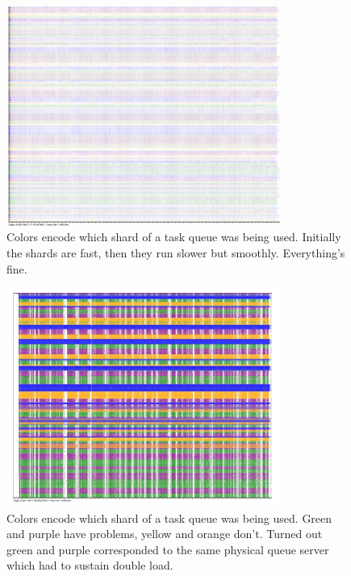 \documentclass{article}
\begin{document}
\begin{figure}[p]
\center
\includegraphics[width=0.8\textwidth]{pics/splot/4-rabbits.png}
\caption{Colors encode which shard of a task queue was being used. Initially the shards are fast, then they run slower but smoothly. Everything's fine.}
\end{figure}

\begin{figure}[p]
\center
\includegraphics[width=0.8\textwidth]{pics/splot/rabbit-collision.png}
\caption{Colors encode which shard of a task queue was being used. Green and purple have problems, yellow and orange don't. Turned out green and purple corresponded to the same physical queue server which had to sustain double load.}
\end{figure}
\end{document}
